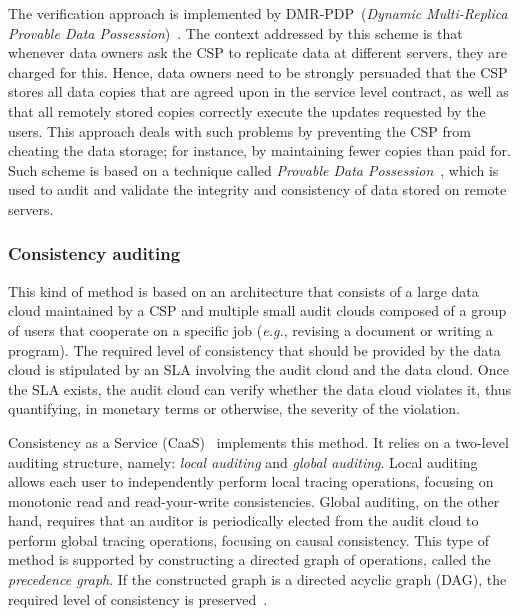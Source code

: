 The verification approach is implemented by DMR-PDP~(\textit{Dynamic Multi-Replica Provable Data Possession})~\cite{MukundanML12}. The context addressed by this scheme is that whenever data owners ask the CSP to replicate data at different servers, they are charged for this. Hence, data owners need to be strongly persuaded that the CSP stores all data copies that are agreed upon in the service level contract, as well as that all remotely stored copies correctly execute the updates requested by the users. 
This approach deals with such problems by preventing the CSP from cheating the data storage; for instance, by maintaining fewer copies than paid for. Such scheme is based on a technique called \textit{Provable Data Possession}~\cite{ateniese2007provable}, which is used to audit and validate the integrity and consistency of data stored on remote servers.

\subsubsection{Consistency auditing}

This kind of method is based on an architecture that consists of a large data cloud maintained by a CSP
and multiple small audit clouds composed of a group of users that cooperate on a specific job ({\it e.g.}, revising a document or writing a program). The required level of consistency that should be provided by the data cloud is stipulated by an SLA 
involving the audit cloud and the data cloud. Once the SLA exists, the audit cloud can verify whether the data cloud violates it, thus quantifying, in monetary terms or otherwise, the severity of the violation.

Consistency as a Service (CaaS)~\cite{liu2014consistency,MathBiradar:2013} implements this method. It relies on a two-level auditing structure, name\-ly: \textit{local auditing} and \textit{global auditing}. Local auditing allows each user to independently perform local tracing operations, focusing on monotonic read and read-your-write consistencies. Global auditing, on the other hand, requires that an auditor is periodically elected from the audit cloud to perform global tracing operations, focusing on causal consistency. This type of method is supported by constructing a directed graph of operations, called the \textit{precedence graph}. If the constructed graph is a directed acyclic graph (DAG), the required level of consistency is preserved~\cite{liu2014consistency}.

